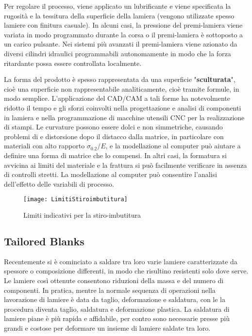 Per regolare il processo, viene applicato un lubrificante e viene specificata la rugosità e la tessitura della superficie della lamiera (vengono utilizzate spesso lamiere con finitura casuale).
In alcuni casi, la pressione del premi-lamiera viene variata in modo programmato durante la corsa o il premi-lamiera è sottoposto a un carico pulsante.
Nei sistemi più avanzati il premi-lamiera viene azionato da diversi cilindri idraulici programmabili autonomamente in modo che la forza ritardante possa essere controllata localmente.

La forma del prodotto è spesso rappresentata da una superficie "\textbf{sculturata}", cioè una superficie non rappresentabile analiticamente, cioè tramite formule, in modo semplice.
L'applicazione del CAD/CAM a tali forme ha notevolmente ridotto il tempo e gli sforzi coinvolti nella progettazione e analisi di componenti in lamiera e nella programmazione di macchine utensili \ac{CNC} per la realizzazione di stampi.
Le curvature possono essere dolci e non simmetriche, causando problemi di  e distorsione dopo il distacco dalla matrice, in particolare con materiali con alto rapporto $\sigma_{0.2}/E$, e la modellazione al computer può aiutare a definire una forma di matrice che lo compensi.
In altri casi, la formatura si avvicina ai limiti del materiale e la frattura si può facilmente verificare in assenza di controlli stretti. La modellazione al computer può consentire l'analisi dell'effetto delle variabili di processo.

\begin{figure}
\centering
\texttt{[image: LimitiStiroimbutitura]}
\caption{Limiti indicativi per la stiro-imbutitura}
\label{fig:Stiroimbutitura}
\end{figure}

\subsection{Tailored Blanks}
Recentemente si è cominciato a saldare tra loro varie lamiere caratterizzate da spessore o composizione differenti, in modo che risultino resistenti solo dove serve.
Le lamiere così ottenute consentono riduzioni della massa e del numero di componenti.
In pratica, mentre la normale sequenza di operazioni nella lavorazione di lamiere è data da taglio, deformazione e saldatura, con le  la procedura diventa taglio, saldatura e deformazione plastica. La saldatura di lamiere piane è più rapida e affidabile, per contro sono necessarie presse più grandi e costose per deformare un insieme di lamiere saldate tra loro.

